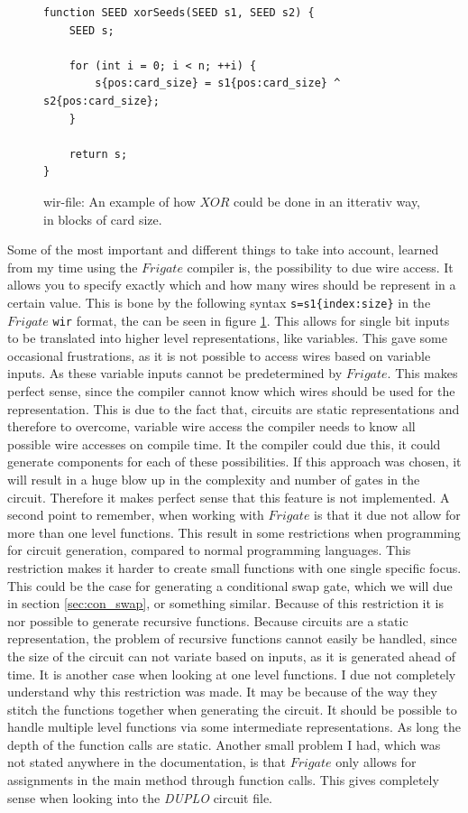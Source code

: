 \documentclass[twoside,11pt,openright]{report}
\newcommand{\DUPLO}{\textit{DUPLO} }
\begin{document}
\begin{figure}[t]
\begin{verbatim}
function SEED xorSeeds(SEED s1, SEED s2) {
    SEED s;
    
    for (int i = 0; i < n; ++i) {
        s{pos:card_size} = s1{pos:card_size} ^ s2{pos:card_size};
    }

    return s;
}
\end{verbatim}
\caption{wir-file: An example of how $XOR$ could be done in an itterativ way, in blocks of card size.}
\label{fig:wir_ex}
\end{figure}

Some of the most important and different things to take into account, learned from my time using the $Frigate$ compiler is, the possibility to due wire access. It allows you to specify exactly which and how many wires should be represent in a certain value. This is bone by the following syntax \verb|s=s1{index:size}| in the $Frigate$ \verb|wir| format, the can be seen in figure \ref{fig:wir_ex}. This allows for single bit inputs to be translated into higher level representations, like variables. This gave some occasional frustrations, as it is not possible to access wires based on variable inputs. As these variable inputs cannot be predetermined by $Frigate$. This makes perfect sense, since the compiler cannot know which wires should be used for the representation. This is due to the fact that, circuits are static representations and therefore to overcome, variable wire access the compiler needs to know all possible wire accesses on compile time. It the compiler could due this, it could generate components for each of these possibilities. If this approach was chosen, it will result in a huge blow up in the complexity and number of gates in the circuit. Therefore it makes perfect sense that this feature is not implemented.
A second point to remember, when working with $Frigate$ is that it due not allow for more than one level functions. This result in some restrictions when programming for circuit generation, compared to normal programming languages. This restriction makes it harder to create small functions with one single specific focus. This could be the case for generating a conditional swap gate, which we will due in section \ref{sec:con_swap}, or something similar. 
Because of this restriction it is nor possible to generate recursive functions. Because circuits are a static representation, the problem of recursive functions cannot easily be handled, since the size of the circuit can not variate based on inputs, as it is generated ahead of time. 
It is another case when looking at one level functions. I due not completely understand why this restriction was made. It may be because of the way they stitch the functions together when generating the circuit. It should be possible to handle multiple level functions via some intermediate representations. As long the depth of the function calls are static.
Another small problem I had, which was not stated anywhere in the documentation, is that $Frigate$ only allows for assignments in the main method through function calls. This gives completely sense when looking into the \DUPLO circuit file.
\end{document}
